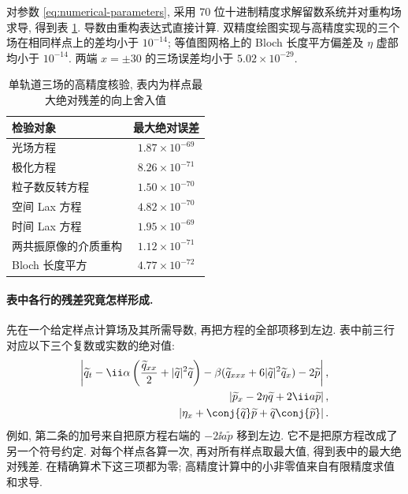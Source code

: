 对参数 \eqref{eq:numerical-parameters}, 采用 70 位十进制精度求解留数系统并对重构场求导, 得到表 \ref{tab:direct-residuals}. 导数由重构表达式直接计算. 双精度绘图实现与高精度实现的三个场在相同样点上的差均小于 $10^{-14}$; 等值图网格上的 Bloch 长度平方偏差及 $\eta$ 虚部均小于 $10^{-14}$. 两端 $x=\pm30$ 的三场误差均小于 $5.02\times10^{-29}$.
\begin{table}[htbp]
\centering
\caption{单轨道三场的高精度核验, 表内为样点最大绝对残差的向上舍入值}
\label{tab:direct-residuals}
\begin{tabular}{lc}
\toprule 检验对象 & 最大绝对误差\\\midrule
光场方程 & $1.87\times10^{-69}$\\
极化方程 & $8.26\times10^{-71}$\\
粒子数反转方程 & $1.50\times10^{-70}$\\
空间 Lax 方程 & $4.82\times10^{-70}$\\
时间 Lax 方程 & $1.95\times10^{-69}$\\
两共振原像的介质重构 & $1.12\times10^{-71}$\\
Bloch 长度平方 & $4.77\times10^{-72}$\\
\bottomrule
\end{tabular}
\end{table}

\paragraph{表中各行的残差究竟怎样形成.}
先在一个给定样点计算场及其所需导数, 再把方程的全部项移到左边. 表中前三行对应以下三个复数或实数的绝对值:
\begin{align*}
\left|\widetilde q_t
-\ii\alpha\left(\dfrac{\widetilde q_{xx}}{2}+|\widetilde q|^2\widetilde q\right)
-\beta(\widetilde q_{xxx}+6|\widetilde q|^2\widetilde q_x)-2\widetilde p\right|,\\
\left|\widetilde p_x-2\eta\widetilde q+2\ii a\widetilde p\right|,\\
\left|\eta_x+\conj{\widetilde q}\widetilde p+\widetilde q\conj{\widetilde p}\right|.
\end{align*}
例如, 第二条的加号来自把原方程右端的 $-2\ii a\widetilde p$ 移到左边. 它不是把原方程改成了另一个符号约定. 对每个样点各算一次, 再对所有样点取最大值, 得到表中的最大绝对残差. 在精确算术下这三项都为零; 高精度计算中的小非零值来自有限精度求值和求导.


